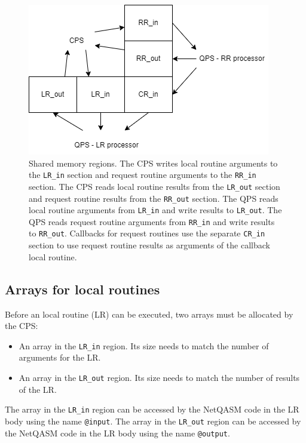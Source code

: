 \begin{figure}[ht]
    \centering
    \includegraphics[width=\columnwidth]{figures/qoala/shared_memory.png}
    \caption{Shared memory regions.
    The CPS writes local routine arguments to the \texttt{LR\_in} section and request routine arguments to the \texttt{RR\_in} section.
    The CPS reads local routine results from the \texttt{LR\_out} section and request routine results from the \texttt{RR\_out} section.
    The QPS reads local routine arguments from \texttt{LR\_in} and write results to \texttt{LR\_out}.
    The QPS reads request routine arguments from \texttt{RR\_in} and write results to \texttt{RR\_out}.
    Callbacks for request routines use the separate \texttt{CR\_in} section to use request routine results as arguments of the callback local routine.
    }
    \label{qoala:fig:app:shared_memory}
\end{figure}


\subsection{Arrays for local routines}
Before an local routine (LR) can be executed, two arrays must be allocated by the CPS:
\begin{itemize}
\item An array in the \texttt{LR\_in} region. Its size needs to match the number of arguments for the LR.
\item An array in the \texttt{LR\_out} region. Its size needs to match the number of results of the LR.
\end{itemize}

The array in the \texttt{LR\_in} region can be accessed by the NetQASM code in the LR body using the name \texttt{@input}.
The array in the \texttt{LR\_out} region can be accessed by the NetQASM code in the LR body using the name \texttt{@output}.

